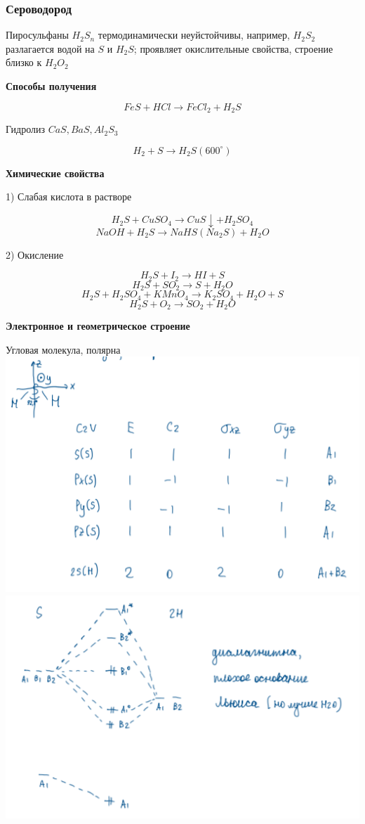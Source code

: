 \subsubsection*{Сероводород}

Пиросульфаны $H_2S_n$ термодинамически неуйстойчивы, например,  $H_2S_2$ разлагается водой на $S$ и $H_2S$; проявляет окислительные свойства, строение близко к $H_2O_2$

\textbf{Способы получения}

$$FeS + HCl \rightarrow FeCl_2 + H_2S$$

Гидролиз $CaS, BaS, Al_2S_3$

$$H_2 + S \rightarrow H_2S (600^{\circ})$$

\textbf{Химические свойства}

1) Слабая кислота в растворе

$$H_2S + CuSO_4 \rightarrow CuS\downarrow + H_2SO_4$$
$$NaOH + H_2S \rightarrow NaHS (Na_2S) + H_2O$$

2) Окисление

$$H_2S + I_2 \rightarrow HI + S$$
$$H_2S + SO_2 \rightarrow S+ H_2O$$
$$H_2S + H_2SO_4 + KMnO_4 \rightarrow K_2SO_4 + H_2O + S$$
$$H_2S + O_2 \rightarrow SO_2 + H_2O$$

\textbf{Электронное и геометрическое строение}

Угловая молекула, полярна\\
\includegraphics{images/6v4.png}
\includegraphics{images/6v5.png}

